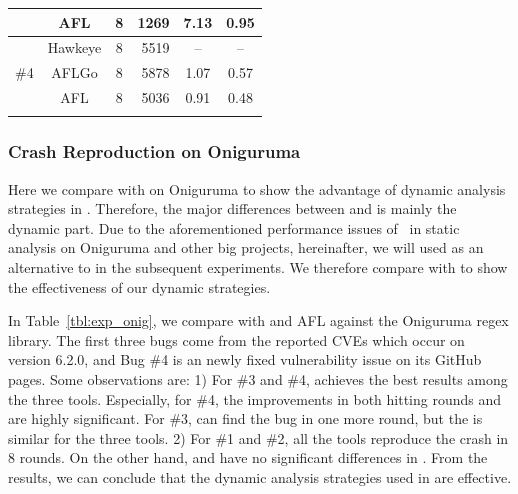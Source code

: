 \begin{table}[t]
\begin{tabular}{c|c|c|r|c|c}
        &        AFL   &            8                                          &                         1269                            &                     7.13                   &              0.95          \\ \hline
        \multirow{3}{*}{\#4}  & Hawkeye &      8                                                &                 5519                                    &              --                         & --                         \\ \cline{2-6} 
        &       AFLGo  &                8                                      &                 5878                                    &             1.07                                 &    0.57              \\ \cline{2-6} 
        &       AFL   &             8                                         &                 5036                                    &             0.91                              &    0.48                 \\ \thickhline          
    \end{tabular}  
\end{table}

\subsubsection{Crash Reproduction on Oniguruma}

Here we compare \dFOT with \dGO on Oniguruma to show the advantage of dynamic analysis strategies in \dFOT.
Therefore, the major differences between {\dFOT} and {\dGO} is mainly the dynamic part.
Due to the aforementioned performance issues of \aflgo~in static analysis on Oniguruma and other big projects, hereinafter, we will used \dGO as an alternative	to \aflgo in the subsequent experiments.
We therefore compare {\dFOT} with {\dGO} to show the effectiveness of our dynamic strategies.

In Table~\ref{tbl:exp_onig}, we compare \dFOT with \dGO and AFL against the Oniguruma regex library. The first three bugs come from the reported CVEs which occur on version 6.2.0, and Bug \#4 is an newly fixed vulnerability issue on its GitHub pages.
Some observations are: 
1) For \#3 and \#4,  \dFOT achieves the best results among the three tools. 
Especially, for \#4, the improvements in both hitting rounds and  {\utte} are highly significant. 
For \#3, \dFOT can find the bug in one more round, but the {\utte} is similar for the three tools.
2) For \#1 and \#2,  all the tools reproduce the crash in 8 rounds. On the other hand, \dFOT and \dGO have no significant differences in {\utte}.
From the results, we can conclude that the dynamic analysis strategies used in \dFOT are effective.



